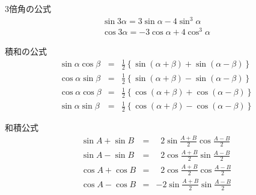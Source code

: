 \documentclass[aspectratio=169, 12pt]{beamer} %
\begin{document}
\begin{frame}{3倍角の公式}
    \begin{eqnarray*}
        \sin 3\alpha = 3\sin\alpha -4 \sin^3 \alpha \\
        \cos 3 \alpha = -3 \cos \alpha + 4 \cos^3\alpha
    \end{eqnarray*}
\end{frame}
\begin{frame}{積和の公式}
    \begin{eqnarray*}
        \sin\alpha \cos\beta &=& \frac{1}{2}\left\{\sin(\alpha+\beta)+\sin(\alpha-\beta)\right\} \\
        \cos\alpha \sin\beta &=& \frac{1}{2}\left\{\sin(\alpha+\beta)-\sin(\alpha-\beta)\right\} \\
        \cos\alpha \cos\beta &=& \frac{1}{2}\left\{\cos(\alpha+\beta)+\cos(\alpha-\beta)\right\} \\
        \sin\alpha \sin\beta &=& \frac{1}{2}\left\{\cos(\alpha+\beta)-\cos(\alpha-\beta)\right\}
    \end{eqnarray*}

\end{frame}
\begin{frame}{和積公式}
    \begin{eqnarray*}
        \sin A+\sin B &=& \;\;2\sin\frac{A+B}{2}\cos\frac{A-B}{2} \\
        \sin A-\sin B&=& \;\;2\cos\frac{A+B}{2}\sin\frac{A-B}{2} \\
        \cos A+\cos B&=& \;\;2\cos\frac{A+B}{2}\cos\frac{A-B}{2} \\
        \cos A-\cos B&=& -2\sin\frac{A+B}{2}\sin\frac{A-B}{2} \\
    \end{eqnarray*}
\end{frame}
\end{document}
